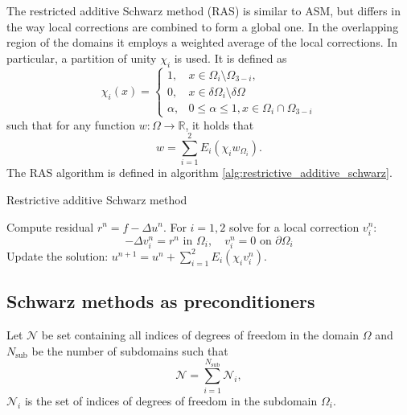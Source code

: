 The restricted additive Schwarz method (RAS) is similar to ASM, but differs in the way local corrections are combined to form a global one. In the overlapping region of the domains it employs a weighted average of the local corrections. In particular, a partition of unity $\chi_i$ is used. It is defined as
\[
    \chi_i(x)=
    \begin{cases}
        1,      & x \in \Omega_i \setminus \Omega_{3-i},                 \\
        0,      & x \in \delta \Omega_i \setminus \delta \Omega          \\
        \alpha, & 0 \leq \alpha \leq 1, x \in \Omega_i \cap \Omega_{3-i}
    \end{cases}
\]
such that for any function $w: \Omega \rightarrow \mathbb{R}$, it holds that
\[
    w = \sum_{i=1}^{2}E_i(\chi_i w_{\Omega_i}).
\]
The RAS algorithm is defined in algorithm \ref{alg:restrictive_additive_schwarz}.
\begin{algorithm}[H]
    \caption{Restrictive additive Schwarz method \cite[Algorithm 1.1]{schwarz_methods_Dolean_2015}}
    \label{alg:restrictive_additive_schwarz}
    \begin{algorithmic}
        \State Compute residual $r^n=f-\Delta u^n$.
        \State For $i=1,2$ solve for a local correction $v_i^n$:
        \[
            -\Delta v_i^n=r^n \text{ in } \Omega_i, \quad v_i^n=0 \text{ on } \partial \Omega_i
        \]
        \State Update the solution: $u^{n+1}=u^n + \sum_{i=1}^{2}E_i(\chi_i v_i^n)$.
    \end{algorithmic}
\end{algorithm}


\subsection{Schwarz methods as preconditioners}
Let $\mathcal{N}$ be set containing all indices of degrees of freedom in the domain $\Omega$ and $N_{\text{sub}}$ be the number of subdomains such that
\[
    \mathcal{N}=\sum_{i=1}^{N_{\text{sub}}} \mathcal{N}_i,
\]
$\mathcal{N}_i$ is the set of indices of degrees of freedom in the subdomain $\Omega_i$.

